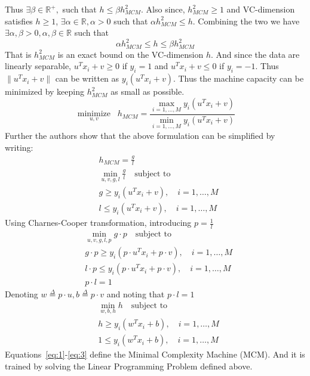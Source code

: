 \documentclass[11pt]{article}
\begin{document}
Thus $\exists\beta\in\mathbb{R}^+,$ such that $h\le\beta h_{MCM}^2$. Also since,
$h_{MCM}^2\ge 1$ and VC\nobreakdash-dimension satisfies $h\ge 1$,
$\exists\alpha\in\mathbb{R},\alpha>0$ such that $\alpha h_{MCM}^2\le h$.
Combining the two we have $\exists \alpha,\beta > 0, \alpha,\beta\in\mathbb{R}$
such that
\begin{equation}
    \alpha h_{MCM}^2\le h\le\beta h_{MCM}^2
\end{equation}
That is $h^2_{MCM}$ is an exact bound on the VC\nobreakdash-dimension $h$. And since the
data are linearly separable, $u^Tx_i+v\ge 0$ if $y_i=1$ and $u^Tx_i+v\le 0$ if
$y_i=-1$. Thus $\lVert u^Tx_i+v\rVert$ can be written as $y_i(u^Tx_i+v)$. Thus
the machine capacity can be minimized by keeping $h_{MCM}^2$ as small as
possible.
\begin{equation}
    \underset{u,v}{\operatorname{minimize}}\;\; h_{MCM}=\frac{\max_{i=1,\dotsc,M}y_i(u^Tx_i+v)}{\min_{i=1,\dotsc,M}y_i(u^Tx_i+v)}
\end{equation}
Further the authors show that the above formulation can be simplified
by writing:
\begin{align}
    &h_{MCM}=\frac{g}{l}\\
    &\min_{u,v,g,l}\frac{g}{l}\quad\text{subject to}\\
    &g\ge y_i(u^Tx_i+v),\quad i=1,\dotsc,M\\
    &l\le y_i(u^Tx_i+v),\quad i=1,\dotsc,M
\end{align}
Using Charnes\nobreakdash-Cooper transformation, introducing $p=\frac{1}{l}$
\begin{align}
    &\min_{u,v,g,l,p}g\cdot p\quad\text{subject to}\\
    &g\cdot p\ge y_i(p\cdot u^Tx_i+p\cdot v),\quad i=1,\dotsc,M\\
    &l\cdot p\le y_i(p\cdot u^Tx_i+p\cdot v),\quad i=1,\dotsc,M\\
    &p\cdot l=1
\end{align}
Denoting $w\stackrel{\Delta}{=}p\cdot u,b\stackrel{\Delta}{=}p\cdot v$ and
noting that $p\cdot l=1$
\begin{align}
    &\label{eq:1}\min_{w,b,h}h\quad\text{subject to}\\
    &\label{eq:2}h\ge y_i(w^Tx_i+b),\quad i=1,\dotsc,M\\
    &\label{eq:3}1\le y_i(w^Tx_i+b),\quad i=1,\dotsc,M
\end{align}
Equations~\ref{eq:1}\nobreakdash-\ref{eq:3} define the Minimal Complexity Machine (MCM). And
it is trained by solving the Linear Programming Problem defined above.
\end{document}
